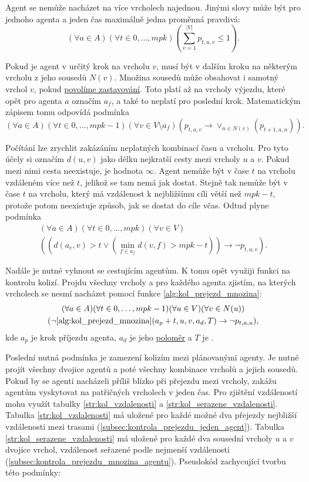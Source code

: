 Agent se nemůže nacházet na více vrcholech najednou.
Jinými slovy může být pro jednoho agenta a jeden čas maximálně jedna proměnná pravdivá:
\[
	(\forall a \in A)(\forall t \in {0, \dots, mpk})\left(\sum_{v=1}^{|V|} p_{t,a,v} \leq 1\right).
\]

Pokud je agent v určitý krok na vrcholu $v$, musí být v dalším kroku na některým vrcholu z jeho sousedů $N(v)$.
Množina sousedů může obsahovat i samotný vrchol $v$,
pokud \hyperref[par:sat_povolene_zastavovani]{povolíme zastavování}.
Toto platí až na vrcholy výjezdu, které opět pro agenta $a$ označím $a_f$, a také to neplatí pro poslední krok.
Matematickým zápisem tomu odpovídá podmínka
\[
	(\forall a \in A)(\forall t \in {0, \dots, mpk - 1})
	(\forall v \in V \setminus a_f)(p_{t,a,v} \rightarrow \vee_{n \in N(v)} (p_{t+1,a,n})).
\]

Počítání lze zrychlit zakázáním neplatných kombinací času a vrcholu.
Pro tyto účely si označím $d(u, v)$ jako délku nejkratší cesty mezi vrcholy $u$ a $v$.
Pokud mezi nimi cesta neexistuje, je hodnota $\infty$.
Agent nemůže být v čase $t$ na vrcholu vzdáleném více než $t$, jelikož se tam nemá jak dostat.
Stejně tak nemůže být v čase $t$ na vrcholu, který má vzdálenost k nejbližšímu cíli větší než $mpk - t$,
protože potom neexistuje způsob, jak se dostat do cíle včas.
Odtud plyne podmínka
\begin{gather*}
(\forall a \in A)(\forall t \in {0, \dots, mpk})(\forall v \in V)
	\\
	((d(a_e, v) > t \vee (\min_{f \in a_f} d(v, f) > mpk - t)) \rightarrow \neg p_{t, a, v}).
\end{gather*}

Nadále je nutné vyhnout se cestujícím agentům.
K tomu opět využiji funkci na kontrolu kolizí.
Projdu všechny vrcholy a pro každého agenta zjistím,
na kterých vrcholech se nesmí nacházet pomocí funkce \ref{alg:kol_prejezd_mnozina}:
\begin{gather*}
(\forall a \in A)(\forall t \in {0, \dots, mpk - 1})(\forall u \in V)
	(\forall v \in N(u)) \\
	(\neg \ref{alg:kol_prejezd_mnozina}(a_p + t, u, v, a_d, T) \rightarrow \neg p_{t, a, u}),
\end{gather*}
kde $a_p$ je krok příjezdu agenta, $a_d$ je jeho \hyperref[par:polomer_agenta]{poloměr}
a $T$ je .

Poslední nutná podmínka je zamezení kolizím mezi plánovanými agenty.
Je nutné projít všechny dvojice agentů a poté všechny kombinace vrcholů a jejich sousedů.
Pokud by se agenti nacházeli příliš blízko při přejezdu mezi vrcholy, zakážu agentům vyskytovat na patřičných vrcholech v jeden čas.
Pro zjištění vzdáleností mohu využít tabulky \ref{str:kol_vzdalenosti} a \ref{str:kol_serazene_vzdalenosti}.
Tabulka \ref{str:kol_vzdalenosti} má uložené pro každé možné dva přejezdy nejbližší vzdálenosti mezi trasami
(\ref{subsec:kontrola_prejezdu_jeden_agent}).
Tabulka \ref{str:kol_serazene_vzdalenosti} má uložené pro každé dva sousední vrcholy $u$ a $v$
dvojice vrchol, vzdálenost seřazené podle nejmenší vzdálenosti (\ref{subsec:kontrola_prejezdu_mnozina_agentu}).
Pseudokód zachycující tvorbu této podmínky:

